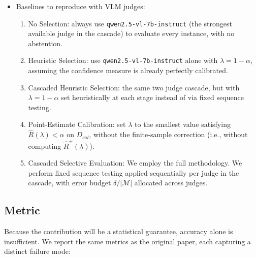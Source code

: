 \documentclass[11pt,a4paper]{article}
\begin{document}
\begin{itemize}[leftmargin=*]
This procedure is applied sequentially down the cascade: $\lambda_i$ is calibrated only on the subset of $D_{cal}$ on which judges $M_1,\ldots,M_{i-1}$ abstain, with an error budget of $\delta/|\mathcal{M}|$ assigned to each judge, ensuring that the guarantee holds jointly across the entire cascade rather than separately for each judge. 
  \item Baselines to reproduce with VLM judges:
        \begin{enumerate}[leftmargin=*]
  \item No Selection: always use \texttt{qwen2.5-vl-7b-instruct} (the strongest
        available judge in the cascade) to evaluate every instance, with no abstention.
  \item Heuristic Selection: use \texttt{qwen2.5-vl-7b-instruct} alone with
        $\lambda = 1-\alpha$, assuming the confidence measure is already perfectly calibrated.
  \item Cascaded Heuristic Selection: the same two judge cascade, but with
        $\lambda = 1-\alpha$ set heuristically at each stage instead of via fixed sequence
        testing.
  \item Point-Estimate Calibration: set $\lambda$ to the smallest value satisfying
        $\widehat{R}(\lambda) < \alpha$ on $D_{cal}$, without the finite-sample correction
        (i.e., without computing $\widehat{R}^{+}(\lambda)$).
  \item Cascaded Selective Evaluation: We employ the full methodology. We perform fixed sequence testing
        applied sequentially per judge in the cascade, with error budget $\delta/|\mathcal{M}|$
        allocated across judges.
\end{enumerate}
\end{itemize}
 
\subsection{Metric}
 
Because the contribution will be a statistical guarantee, accuracy alone is insufficient. We
report the same metrics as the original paper, each capturing a distinct failure mode:
 
\end{document}
